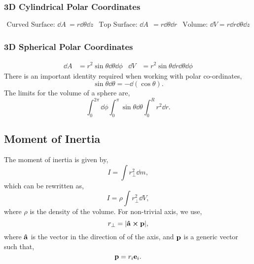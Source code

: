 \documentclass{book}
\begin{document}
\subsubsection{3D Cylindrical Polar Coordinates}
\begin{align}
    \text{Curved Surface: }\dd{A}&=r\dd{\theta}\dd{z} & \text{Top Surface: } \dd{A}&=r\dd{\theta}\dd{r} & \text{Volume: } \dd{V}=r\dd{r}\dd{\theta}\dd{z}
\end{align}
\subsubsection{3D Spherical Polar Coordinates}
\begin{align}
    \dd{A} &= r^2\sin\theta\dd{\theta}\dd{\phi} & \dd{V}&=r^2\sin\theta\dd{r}\dd{\theta}\dd{\phi}
\end{align}
There is an important identity required when working with polar co-ordinates,
\begin{equation}
    \sin\theta\dd{\theta} = -\dd{(\cos\theta)}.
\end{equation}
The limits for the volume of a sphere are,
\begin{equation}
    \int_0^{2\pi}\dd{\phi}\int_{0}^{\pi}\sin\theta\dd{\theta}\int_0^Rr^2\dd{r}.
\end{equation}
\subsection{Moment of Inertia}
The moment of inertia is given by,
\begin{equation}
    I = \int r_{\perp}^2\dd{m},
\end{equation}
which can be rewritten as,
\begin{equation}
    I = \rho\int r_{\perp}^2\dd{V},
\end{equation}
where $\rho$ is the density of the volume. For non-trivial axis, we use,
\begin{equation}
    r_{\perp} = |\vu{a}\cross\vb{p}|,
\end{equation}
where $\vu{a}$ is the vector in the direction of of the axis, and $\vb{p}$ is a generic vector such that,
\begin{equation}
    \vb{p} = r_i\vb{e}_i.
\end{equation}
\end{document}
